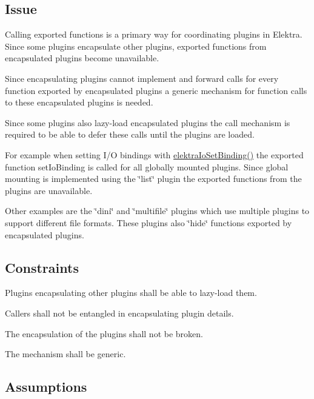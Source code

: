 \subsection*{Issue}

Calling exported functions is a primary way for coordinating plugins in Elektra. Since some plugins encapsulate other plugins, exported functions from encapsulated plugins become unavailable.

Since encapsulating plugins cannot implement and forward calls for every function exported by encapsulated plugins a generic mechanism for function calls to these encapsulated plugins is needed.

Since some plugins also lazy-\/load encapsulated plugins the call mechanism is required to be able to defer these calls until the plugins are loaded.

For example when setting I/O bindings with {\ttfamily \hyperlink{group__kdbio_ga187345483bdfbb404919c6797bc2db77}{elektra\+Io\+Set\+Binding()}} the exported function {\ttfamily set\+Io\+Binding} is called for all globally mounted plugins. Since global mounting is implemented using the \char`\"{}list\char`\"{} plugin the exported functions from the plugins are unavailable.

Other examples are the \char`\"{}dini\char`\"{} and \char`\"{}multifile\char`\"{} plugins which use multiple plugins to support different file formats. These plugins also \char`\"{}hide\char`\"{} functions exported by encapsulated plugins.

\subsection*{Constraints}


\begin{DoxyEnumerate}
\item Plugins encapsulating other plugins shall be able to lazy-\/load them.
\item Callers shall not be entangled in encapsulating plugin details.
\item The encapsulation of the plugins shall not be broken.
\item The mechanism shall be generic.
\end{DoxyEnumerate}

\subsection*{Assumptions}


